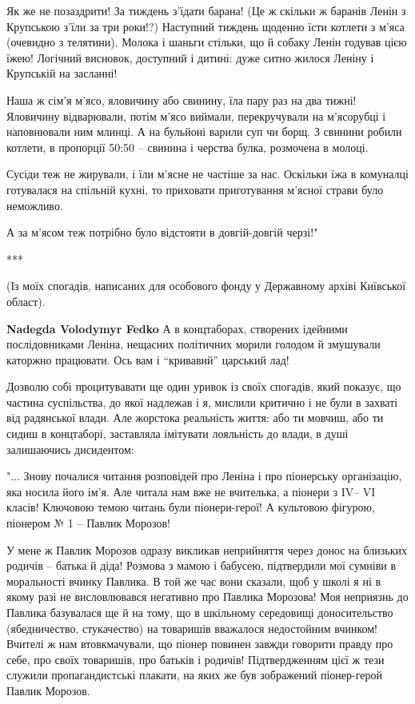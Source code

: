 \begin{itemize}
Як же не позаздрити! За тиждень з’їдати барана! (Це ж скільки ж баранів Ленін з
Крупською з’їли за три роки!?) Наступний тиждень щоденно їсти котлети з м’яса
(очевидно з телятини). Молока і шаньги стільки, що й собаку Ленін годував цією
їжею! Логічний висновок, доступний і дитині: дуже ситно жилося Леніну і
Крупській на засланні!

Наша ж сім’я м’ясо, яловичину або свинину, їла пару раз на два тижні! Яловичину
відварювали, потім м’ясо виймали, перекручували на м’ясорубці і наповнювали ним
млинці. А на бульйоні варили суп чи борщ. З свинини робили котлети, в пропорції
50:50 – свинина і черства булка, розмочена в молоці.

Сусіди теж не жирували, і їли м’ясне не частіше за нас. Оскільки їжа в
комуналці готувалася на спільній кухні, то приховати приготування м’ясної
страви було неможливо.

А за м’ясом теж потрібно було відстояти в довгій-довгій черзі!"

***

(Із моїх спогадів, написаних для особового фонду у Державному архіві Київської
област).

\begin{itemize} %
\textbf{Nadegda Volodymyr Fedko} А в концтаборах, створених ідейними послідовниками Леніна, нещасних політичних морили голодом й змушували каторжно працювати. Ось вам і \enquote{кривавий} царський лад!
\end{itemize} %


Дозволю собі процитувавати ще один уривок із своїх спогадів, який показує, що
частина суспільства, до якої надлежав і я, мислили критично і не були в захваті
від радянської влади. Але жорстока реальність життя: або ти мовчиш, або ти
сидиш в концтаборі, заставляла імітувати лояльність до влади, в душі
залишаючись дисидентом:

"... Знову почалися читання розповідей про Леніна і про піонерську організацію,
яка носила його ім’я. Але читала нам вже не вчителька, а піонери з IV– VI
класів! Ключовою темою читань були піонери-герої! А культовою фігурою, піонером
№ 1 – Павлик Морозов!

У мене ж Павлик Морозов одразу викликав неприйняття через донос на близьких
родичів – батька й діда! Розмова з мамою і бабусею, підтвердили мої сумніви в
моральності вчинку Павлика. В той же час вони сказали, щоб у школі я ні в якому
разі не висловлювався негативно про Павлика Морозова! Моя неприязнь до Павлика
базувалася ще й на тому, що в шкільному середовищі доносительство
(ябедничество, стукачество) на товаришів вважалося недостойним вчинком! Вчителі
ж нам втовкмачували, що піонер повинен завжди говорити правду про себе, про
своїх товаришів, про батьків і родичів! Підтвердженням цієї ж тези служили
пропагандистські плакати, на яких же був зображений піонер-герой Павлик
Морозов.


\end{itemize}
